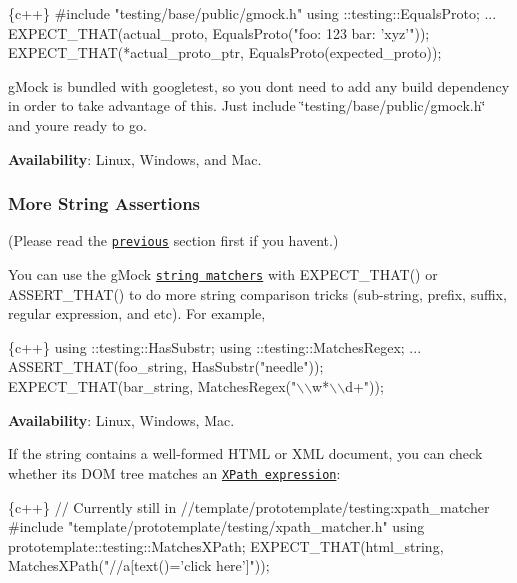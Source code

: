 \begin{DoxyCode}
\{c++\}
#include "testing/base/public/gmock.h"
using ::testing::EqualsProto;
...
    EXPECT\_THAT(actual\_proto, EqualsProto("foo: 123 bar: 'xyz'"));
    EXPECT\_THAT(*actual\_proto\_ptr, EqualsProto(expected\_proto));
\end{DoxyCode}


g\+Mock is bundled with googletest, so you don\textquotesingle{}t need to add any build dependency in order to take advantage of this. Just include {\ttfamily \char`\"{}testing/base/public/gmock.\+h\char`\"{}} and you\textquotesingle{}re ready to go.

{\bfseries Availability}\+: Linux, Windows, and Mac.

\subsubsection*{More String Assertions}

(Please read the \href{#asserting-using-gmock-matchers}{\tt previous} section first if you haven\textquotesingle{}t.)

You can use the g\+Mock \href{../../googlemock/docs/CheatSheet.md#string-matchers}{\tt string matchers} with {\ttfamily E\+X\+P\+E\+C\+T\+\_\+\+T\+H\+A\+T()} or {\ttfamily A\+S\+S\+E\+R\+T\+\_\+\+T\+H\+A\+T()} to do more string comparison tricks (sub-\/string, prefix, suffix, regular expression, and etc). For example,


\begin{DoxyCode}
\{c++\}
using ::testing::HasSubstr;
using ::testing::MatchesRegex;
...
  ASSERT\_THAT(foo\_string, HasSubstr("needle"));
  EXPECT\_THAT(bar\_string, MatchesRegex("\(\backslash\)\(\backslash\)w*\(\backslash\)\(\backslash\)d+"));
\end{DoxyCode}


{\bfseries Availability}\+: Linux, Windows, Mac.

If the string contains a well-\/formed H\+T\+ML or X\+ML document, you can check whether its D\+OM tree matches an \href{http://www.w3.org/TR/xpath/#contents}{\tt X\+Path expression}\+:


\begin{DoxyCode}
\{c++\}
// Currently still in //template/prototemplate/testing:xpath\_matcher
#include "template/prototemplate/testing/xpath\_matcher.h"
using prototemplate::testing::MatchesXPath;
EXPECT\_THAT(html\_string, MatchesXPath("//a[text()='click here']"));
\end{DoxyCode}


